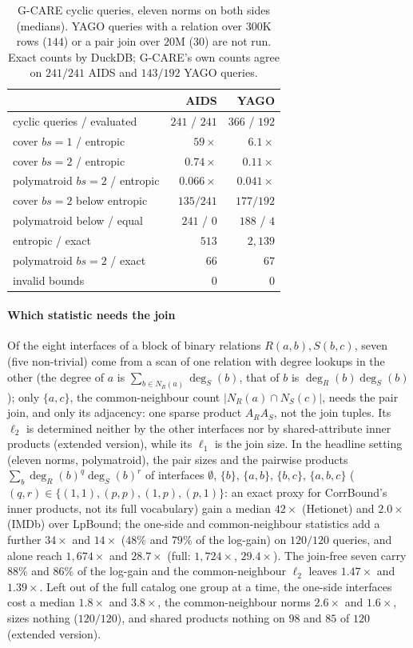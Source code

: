 \documentclass[conference]{IEEEtran}
\begin{document}
\begin{table}[t]
\centering
\caption{G-CARE cyclic queries, eleven norms on both sides (medians). YAGO
queries with a relation over $300$K rows ($144$) or a pair join over
$20$M ($30$) are not run. Exact counts by DuckDB; G-CARE's own counts
agree on $241/241$ AIDS and $143/192$ YAGO queries.}
\label{tab:gcare}
\small\setlength{\tabcolsep}{4pt}
\begin{tabular}{@{}lrr@{}}
\toprule
 & AIDS & YAGO \\
\midrule
cyclic queries / evaluated & $241$ / $241$ & $366$ / $192$ \\
cover $bs{=}1$ / entropic & $59\times$ & $6.1\times$ \\
cover $bs{=}2$ / entropic & $0.74\times$ & $0.11\times$ \\
polymatroid $bs{=}2$ / entropic & $0.066\times$ & $0.041\times$ \\
cover $bs{=}2$ below entropic & $135/241$ & $177/192$ \\
polymatroid below / equal & $241$ / $0$ & $188$ / $4$ \\
entropic / exact & $513$ & $2{,}139$ \\
polymatroid $bs{=}2$ / exact & $66$ & $67$ \\
invalid bounds & $0$ & $0$ \\
\bottomrule
\end{tabular}
\end{table}

\paragraph{Which statistic needs the join}
Of the eight interfaces of a block of binary relations $R(a,b),S(b,c)$,
seven (five non-trivial) come from a scan of one relation with degree lookups in the other
(the degree of $a$ is $\sum_{b\in N_R(a)}\deg_S(b)$, that of $b$ is
$\deg_R(b)\deg_S(b)$); only $\{a,c\}$, the common-neighbour count
$|N_R(a)\cap N_S(c)|$, needs the pair join, and only its adjacency: one
sparse product $A_RA_S$, not the join tuples. Its $\ell_2$ is determined
neither by the other interfaces nor by shared-attribute inner products
(extended version), while its $\ell_1$ is the join size. In the headline
setting (eleven norms, polymatroid), the pair sizes and the pairwise
products $\sum_b \deg_R(b)^q\deg_S(b)^r$ of interfaces $\emptyset$, $\{b\}$,
$\{a,b\}$, $\{b,c\}$, $\{a,b,c\}$ ($(q,r)\in\{(1,1),(p,p),(1,p),(p,1)\}$: an exact proxy for CorrBound's inner products, not its full vocabulary)
gain a median $42\times$ (Hetionet) and $2.0\times$ (IMDb) over LpBound; the
one-side and common-neighbour statistics add a further $34\times$ and
$14\times$ ($48\%$ and $79\%$ of the log-gain) on $120/120$ queries, and alone reach $1{,}674\times$ and
$28.7\times$ (full: $1{,}724\times$, $29.4\times$). The join-free seven
carry $88\%$ and $86\%$ of the log-gain and the common-neighbour $\ell_2$
leaves $1.47\times$ and $1.39\times$. Left out of the full catalog one
group at a time, the one-side interfaces cost a median $1.8\times$ and
$3.8\times$, the common-neighbour norms $2.6\times$ and $1.6\times$,
sizes nothing ($120/120$), and shared products nothing on $98$ and $85$ of
$120$ (extended version).
\end{document}

